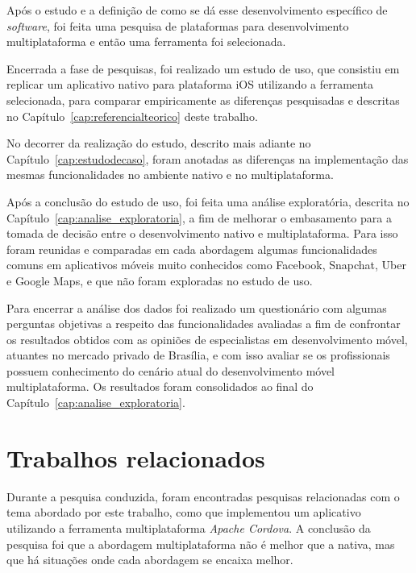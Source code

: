 Após o estudo e a definição de como se dá esse desenvolvimento específico de \textit{software},
foi feita uma pesquisa de plataformas para desenvolvimento multiplataforma e então uma ferramenta foi selecionada. 

Encerrada a fase de pesquisas, foi realizado um estudo de uso, que consistiu em replicar um aplicativo nativo para plataforma iOS utilizando a ferramenta selecionada, 
para comparar empiricamente as diferenças pesquisadas e descritas no Capítulo~\ref{cap:referencialteorico} deste trabalho.

No decorrer da realização do estudo, descrito mais adiante no Capítulo~\ref{cap:estudodecaso}, foram anotadas as diferenças na implementação das mesmas funcionalidades no ambiente nativo e no 
multiplataforma.

Após a conclusão do estudo de uso, foi feita uma análise exploratória, descrita no Capítulo~\ref{cap:analise_exploratoria}, 
a fim de melhorar o embasamento para a tomada de decisão entre o desenvolvimento 
nativo e multiplataforma. Para isso foram reunidas e comparadas em cada abordagem algumas funcionalidades comuns em aplicativos 
móveis muito conhecidos como Facebook, Snapchat, Uber e Google Maps, e que não foram exploradas no estudo de uso. 

Para encerrar a análise dos dados foi realizado um questionário com algumas perguntas objetivas a respeito das funcionalidades avaliadas a fim de confrontar os resultados obtidos com 
as opiniões de especialistas em 
desenvolvimento móvel, atuantes no mercado privado de Brasília, e com isso avaliar se os profissionais possuem conhecimento do cenário atual do desenvolvimento móvel multiplataforma. Os resultados foram consolidados ao final do 
Capítulo~\ref{cap:analise_exploratoria}.


\section{Trabalhos relacionados} \label{sec:trabalhosrelacionados}

Durante a pesquisa conduzida, foram encontradas pesquisas relacionadas com o tema abordado por este trabalho, como 
que implementou um aplicativo utilizando a ferramenta multiplataforma \textit{Apache Cordova}. A conclusão da pesquisa foi 
que a abordagem multiplataforma não é melhor que a nativa, mas que há situações onde cada abordagem se encaixa melhor.

